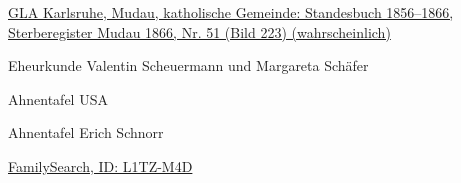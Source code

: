 \begin{person}[
    surname = {Schäfer},
    givenname = {Johann Josef},
    suffix = {1822--1866},
    label = {@I952@}
    ]
\begin{enumerate}[label={[\arabic*]}]
\item \href{http://www.landesarchiv-bw.de/plink/?f=4-1119481-223}{GLA Karlsruhe, Mudau, katholische Gemeinde: Standesbuch 1856–1866, Sterberegister Mudau 1866, Nr. 51 (Bild 223) (wahrscheinlich)}
\item Eheurkunde Valentin Scheuermann und Margareta Schäfer
\item Ahnentafel USA
\item Ahnentafel Erich Schnorr
\item \href{https://www.familysearch.org/tree/person/details/L1TZ-M4D}{FamilySearch, ID: L1TZ-M4D}
\end{enumerate}

\end{person}

\begin{person}[
    surname = {Baumann},
    givenname = {Margaretha},
    suffix = {1819--1878},
    label = {@I953@}
    ]


\end{person}
